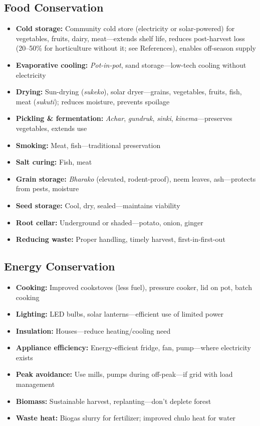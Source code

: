 \documentclass[11pt,a4paper]{article}
\begin{document}
\subsection{Food Conservation}
\begin{itemize}
    \item \textbf{Cold storage:} Community cold store (electricity or solar-powered) for vegetables, fruits, dairy, meat---extends shelf life, reduces post-harvest loss (20--50\% for horticulture without it; see References), enables off-season supply
    \item \textbf{Evaporative cooling:} \textit{Pot-in-pot}, sand storage---low-tech cooling without electricity
    \item \textbf{Drying:} Sun-drying (\textit{sukeko}), solar dryer---grains, vegetables, fruits, fish, meat (\textit{sukuti}); reduces moisture, prevents spoilage
    \item \textbf{Pickling \& fermentation:} \textit{Achar}, \textit{gundruk}, \textit{sinki}, \textit{kinema}---preserves vegetables, extends use
    \item \textbf{Smoking:} Meat, fish---traditional preservation
    \item \textbf{Salt curing:} Fish, meat
    \item \textbf{Grain storage:} \textit{Bharako} (elevated, rodent-proof), neem leaves, ash---protects from pests, moisture
    \item \textbf{Seed storage:} Cool, dry, sealed---maintains viability
    \item \textbf{Root cellar:} Underground or shaded---potato, onion, ginger
    \item \textbf{Reducing waste:} Proper handling, timely harvest, first-in-first-out
\end{itemize}

\subsection{Energy Conservation}
\begin{itemize}
    \item \textbf{Cooking:} Improved cookstoves (less fuel), pressure cooker, lid on pot, batch cooking
    \item \textbf{Lighting:} LED bulbs, solar lanterns---efficient use of limited power
    \item \textbf{Insulation:} Houses---reduce heating/cooling need
    \item \textbf{Appliance efficiency:} Energy-efficient fridge, fan, pump---where electricity exists
    \item \textbf{Peak avoidance:} Use mills, pumps during off-peak---if grid with load management
    \item \textbf{Biomass:} Sustainable harvest, replanting---don't deplete forest
    \item \textbf{Waste heat:} Biogas slurry for fertilizer; improved chulo heat for water
\end{itemize}
\end{document}
